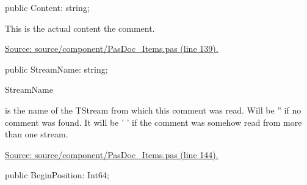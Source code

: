 \documentclass{report}
\newif\ifpdf
\begin{document}
\begin{list}{}{
\setlength{\itemindent}{0cm}
\setlength{\listparindent}{0cm}
\setlength{\leftmargin}{\evensidemargin}
\addtolength{\leftmargin}{\tmplength}
\settowidth{\labelsep}{X}
\addtolength{\leftmargin}{\labelsep}
\setlength{\labelwidth}{\tmplength}
}
\label{PasDoc_Items.TRawDescriptionInfo-Content}
\item[\textbf{Content}\hfill]
\ifpdf
\begin{flushleft}
\fi
\begin{ttfamily}
public Content: string;\end{ttfamily}

\ifpdf
\end{flushleft}
\fi


\par This is the actual content the comment.\par
\href{https://github.com/pasdoc/pasdoc/blob/master/source/component/PasDoc_Items.pas#L139}{Source: source/component/PasDoc{\_}Items.pas (line 139).}\label{PasDoc_Items.TRawDescriptionInfo-StreamName}
\item[\textbf{StreamName}\hfill]
\ifpdf
\begin{flushleft}
\fi
\begin{ttfamily}
public StreamName: string;\end{ttfamily}

\ifpdf
\end{flushleft}
\fi


\par \begin{ttfamily}StreamName\end{ttfamily} is the name of the TStream from which this comment was read. Will be '' if no comment was found. It will be ' ' if the comment was somehow read from more than one stream.\par
\href{https://github.com/pasdoc/pasdoc/blob/master/source/component/PasDoc_Items.pas#L144}{Source: source/component/PasDoc{\_}Items.pas (line 144).}\label{PasDoc_Items.TRawDescriptionInfo-BeginPosition}
\item[\textbf{BeginPosition}\hfill]
\ifpdf
\begin{flushleft}
\fi
\begin{ttfamily}
public BeginPosition: Int64;\end{ttfamily}

\ifpdf
\end{flushleft}
\fi



\end{list}
\end{document}
